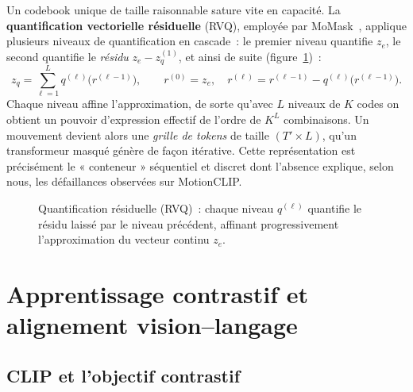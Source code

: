 \documentclass[12pt,a4paper,oneside]{report}
\theoremstyle{definition}
\theoremstyle{plain}
\begin{document}
Un codebook unique de taille raisonnable sature vite en capacité. La
\textbf{quantification vectorielle résiduelle} (RVQ), employée par
MoMask~\cite{guo2024momask}, applique plusieurs niveaux de quantification en
cascade~: le premier niveau quantifie $z_e$, le second quantifie le \emph{résidu}
$z_e - z_q^{(1)}$, et ainsi de suite (figure~\ref{fig:rvq})~:
\begin{equation}
z_q = \sum_{\ell=1}^{L} q^{(\ell)}\!\big(r^{(\ell-1)}\big),\qquad
r^{(0)} = z_e,\quad r^{(\ell)} = r^{(\ell-1)} - q^{(\ell)}\!\big(r^{(\ell-1)}\big).
\end{equation}
Chaque niveau affine l'approximation, de sorte qu'avec $L$ niveaux de $K$ codes on
obtient un pouvoir d'expression effectif de l'ordre de $K^L$ combinaisons. Un
mouvement devient alors une \emph{grille de tokens} de taille $(T'\times L)$, qu'un
transformeur masqué génère de façon itérative. Cette représentation est précisément
le « conteneur » séquentiel et discret dont l'absence explique, selon nous, les
défaillances observées sur MotionCLIP.

\begin{figure}[ht]
\centering
{}
\caption{Quantification résiduelle (RVQ)~: chaque niveau $q^{(\ell)}$ quantifie le
résidu laissé par le niveau précédent, affinant progressivement l'approximation du
vecteur continu $z_e$.}
\label{fig:rvq}
\end{figure}

\section{Apprentissage contrastif et alignement vision--langage}
\label{sec:contrastif}

\subsection{CLIP et l'objectif contrastif}
\end{document}
